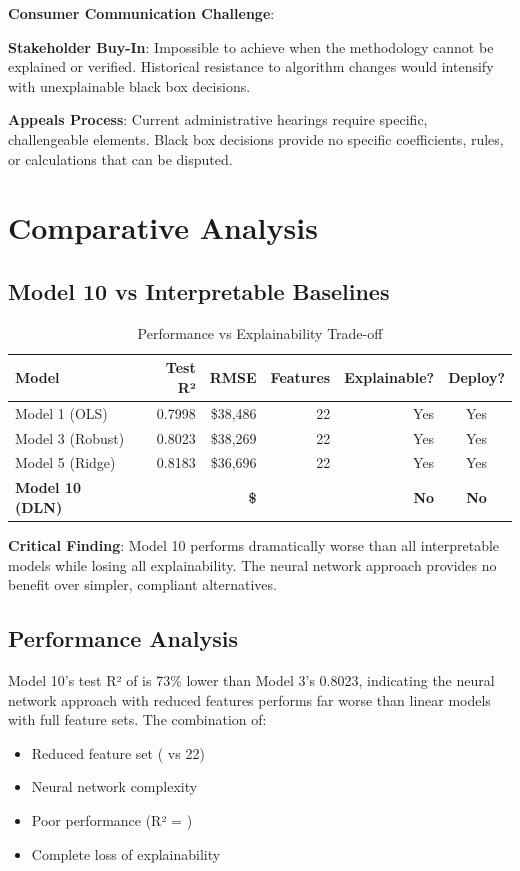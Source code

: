 \textbf{Consumer Communication Challenge}: \ModelTenBlackBoxWarning{}

\textbf{Stakeholder Buy-In}: Impossible to achieve when the methodology cannot be explained or verified. Historical resistance to algorithm changes would intensify with unexplainable black box decisions.

\textbf{Appeals Process}: Current administrative hearings require specific, challengeable elements. Black box decisions provide no specific coefficients, rules, or calculations that can be disputed.

\section{Comparative Analysis}

\subsection{Model 10 vs Interpretable Baselines}

\begin{table}[h]
\centering
\caption{Performance vs Explainability Trade-off}
\begin{tabular}{lrrrrc}
\toprule
\textbf{Model} & \textbf{Test R²} & \textbf{RMSE} & \textbf{Features} & \textbf{Explainable?} & \textbf{Deploy?} \\
\midrule
Model 1 (OLS) & 0.7998 & \$38,486 & 22 & Yes &  Yes \\
Model 3 (Robust) & 0.8023 & \$38,269 & 22 & Yes &  Yes \\
Model 5 (Ridge) & 0.8183 & \$36,696 & 22 & Yes &  Yes \\
\textbf{Model 10 (DLN)} & \textbf{\ModelTenRSquaredTest{}} & \textbf{\$\ModelTenRMSETest{}} & \textbf{\ModelTenRobustFeatures{}} & \textbf{No} &  \textbf{No} \\
\bottomrule
\end{tabular}
\end{table}

\textbf{Critical Finding}: Model 10 performs dramatically worse than all interpretable models while losing all explainability. The neural network approach provides no benefit over simpler, compliant alternatives.

\subsection{Performance Analysis}

Model 10's test R² of \ModelTenRSquaredTest{} is 73\% lower than Model 3's 0.8023, indicating the neural network approach with reduced features performs far worse than linear models with full feature sets. The combination of:
\begin{itemize}
    \item Reduced feature set (\ModelTenRobustFeatures{} vs 22)
    \item Neural network complexity
    \item Poor performance (R² = \ModelTenRSquaredTest{})
    \item Complete loss of explainability
\end{itemize}

